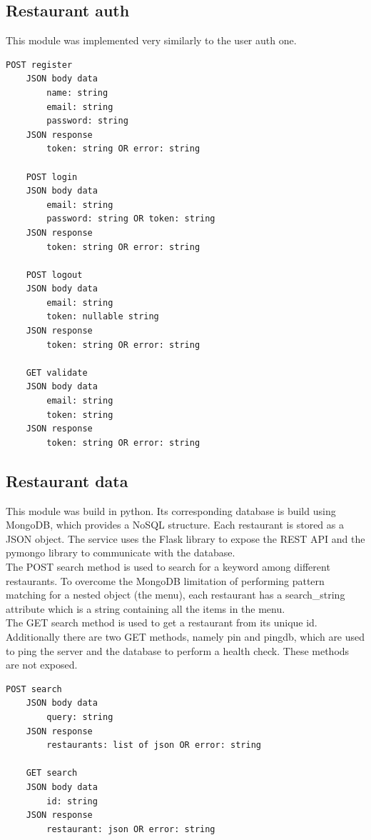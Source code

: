 \subsection{Restaurant auth}

This module was implemented very similarly to the user auth one.


\begin{lstlisting}[language=bash,caption={Restaurant auth exposed API}]
    POST register
    JSON body data
        name: string
        email: string
        password: string
    JSON response
        token: string OR error: string
        
    POST login
    JSON body data
        email: string
        password: string OR token: string
    JSON response
        token: string OR error: string

    POST logout
    JSON body data
        email: string
        token: nullable string
    JSON response
        token: string OR error: string

    GET validate
    JSON body data
        email: string
        token: string
    JSON response
        token: string OR error: string
\end{lstlisting}

\subsection{Restaurant data}
This module was build in python. Its corresponding database is build using MongoDB, which provides a NoSQL structure. Each restaurant is stored as a JSON object. The service uses the Flask library to expose the REST API and the pymongo library to communicate with the database. \\
The POST search method is used to search for a keyword among different restaurants. To overcome the MongoDB limitation of performing pattern matching for a nested object (the menu), each restaurant has a search\_string attribute which is a string containing all the items in the menu. \\
The GET search method is used to get a restaurant from its unique id. \\
Additionally there are two GET methods, namely pin and pingdb, which are used to ping the server and the database to perform a health check. These methods are not exposed. 


\begin{lstlisting}[language=bash,caption={Restaurant data exposed API}]
    POST search
    JSON body data
        query: string
    JSON response
        restaurants: list of json OR error: string
        
    GET search
    JSON body data
        id: string
    JSON response
        restaurant: json OR error: string
\end{lstlisting}


